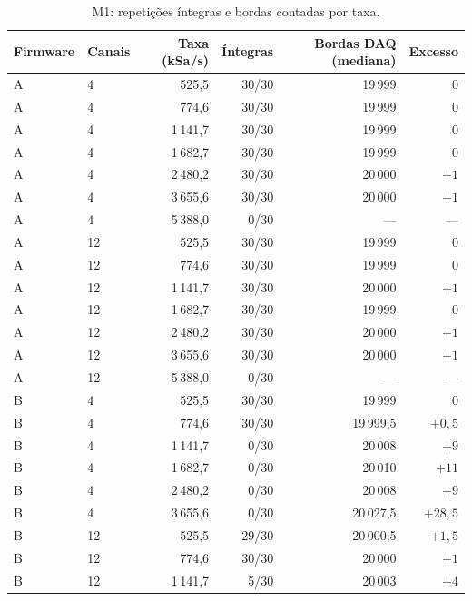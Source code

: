 \begin{table}[H]
  \centering
  \caption{M1: repetições íntegras e bordas contadas por taxa.}
  \label{tab:m1-resumo}
  \small
  \begin{tabular}{@{}llrrrr@{}}
    \toprule
    \textbf{Firmware} & \textbf{Canais} & \textbf{Taxa (kSa/s)} &
    \textbf{Íntegras} & \textbf{Bordas \acs{DAQ} (mediana)} &
    \textbf{Excesso} \\
    \midrule
    A & 4  & 525,5    & 30/30 & 19\,999 & $0$ \\
    A & 4  & 774,6    & 30/30 & 19\,999 & $0$ \\
    A & 4  & 1\,141,7 & 30/30 & 19\,999 & $0$ \\
    A & 4  & 1\,682,7 & 30/30 & 19\,999 & $0$ \\
    A & 4  & 2\,480,2 & 30/30 & 20\,000 & $+1$ \\
    A & 4  & 3\,655,6 & 30/30 & 20\,000 & $+1$ \\
    A & 4  & 5\,388,0 & 0/30  & ---     & ---  \\
    A & 12 & 525,5    & 30/30 & 19\,999 & $0$ \\
    A & 12 & 774,6    & 30/30 & 19\,999 & $0$ \\
    A & 12 & 1\,141,7 & 30/30 & 20\,000 & $+1$ \\
    A & 12 & 1\,682,7 & 30/30 & 19\,999 & $0$ \\
    A & 12 & 2\,480,2 & 30/30 & 20\,000 & $+1$ \\
    A & 12 & 3\,655,6 & 30/30 & 20\,000 & $+1$ \\
    A & 12 & 5\,388,0 & 0/30  & ---     & ---  \\
    \midrule
    B & 4  & 525,5    & 30/30 & 19\,999    & $0$       \\
    B & 4  & 774,6    & 30/30 & 19\,999,5  & $+0{,}5$  \\
    B & 4  & 1\,141,7 & 0/30  & 20\,008    & $+9$      \\
    B & 4  & 1\,682,7 & 0/30  & 20\,010    & $+11$     \\
    B & 4  & 2\,480,2 & 0/30  & 20\,008    & $+9$      \\
    B & 4  & 3\,655,6 & 0/30  & 20\,027,5  & $+28{,}5$ \\
    B & 12 & 525,5    & 29/30 & 20\,000,5  & $+1{,}5$  \\
    B & 12 & 774,6    & 30/30 & 20\,000    & $+1$      \\
    B & 12 & 1\,141,7 & 5/30  & 20\,003    & $+4$      \\

\end{tabular}
\end{table}
